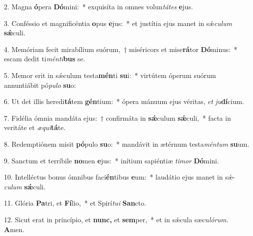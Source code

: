 \item 2. Magna \textbf{ó}pera \textbf{Dó}mini:~* exquisíta in omnes volun\hspace{0.03em}\textit{tátes} \textbf{e}jus.
\item 3. Conféssio et magnificéntia \textbf{o}pus \textbf{e}jus:~* et justítia ejus manet in sǽ\hspace{0.03em}\textit{culum} \textbf{sǽ}culi.
\item 4. Memóriam fecit mirabílium suórum,~† miséricors et mise\textbf{rá}tor \textbf{Dó}minus:~* escam dedit ti\hspace{0.03em}\textit{ménti}\textbf{bus} se.
\item 5. Memor erit in sǽculum testa\textbf{mén}ti \textbf{su}i:~* virtútem óperum suórum annuntiábit pó\textit{pulo} \textbf{su}o:
\item 6. Ut det illis heredi\textbf{tá}tem \textbf{gén}tium:~* ópera mánuum ejus véritas, \textit{et} \textit{ju}\textbf{dí}cium.
\item 7. Fidélia ómnia mandáta ejus:~† confirmáta in \textbf{sǽ}culum \textbf{sǽ}culi,~* facta in veritáte et \textit{æqui}\textbf{tá}te.
\item 8. Redemptiónem misit \textbf{pó}pulo \textbf{su}o:~* mandávit in ætérnum testa\hspace{0.03em}\textit{méntum} \textbf{su}um.
\item 9. Sanctum et terríbile \textbf{no}men \textbf{e}jus:~* inítium sapiéntiæ \textit{timor} \textbf{Dó}mini.
\item 10. Intelléctus bonus ómnibus faci\textbf{én}tibus \textbf{e}um:~* laudátio ejus manet in sǽ-\-\hspace{0.03em}\textit{culum} \textbf{sǽ}culi.
\item 11. Glória \textbf{Pa}tri, et \textbf{Fí}lio,~* et Spirí\hspace{0.03em}\textit{tui} \textbf{San}cto.
\item 12. Sicut erat in princípio, et \textbf{nunc,} et \textbf{sem}per,~* et in sǽcula sæcu\hspace{0.03em}\textit{lórum.} \textbf{A}men.


